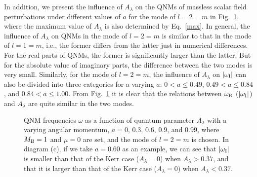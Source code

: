 \documentclass[12pt]{article}
\begin{document}
In addition, we present the influence of $A_\lambda$ on the QNMs of massless scalar field perturbations under different values of $a$ for the mode of $l=2=m$ in Fig.~\ref{fig:QNM-A-a-2}, where the maximum value of $A_\lambda$ is also determined by Eq.~\eqref{max}.
In general, the influence of $A_\lambda$ on QNMs in the mode of $l=2=m$ is similar to that in the mode of $l=1=m$, i.e., the former differs from the latter just in  numerical differences.
For the real parts of QNMs, the former is significantly larger than the latter.
But for the absolute value of imaginary parts, the difference between the two modes is very small.
Similarly, for the mode of $l=2=m$, the influence of $A_\lambda$ on $|\omega_{\rm I}|$ can also be divided into three categories for a varying $a$: $0<a\leq0.49$, $0.49<a\leq0.84$, and $0.84<a\leq1.00$.
From Fig.~\ref{fig:QNM-A-a-2} it is clear that the relations between $\omega_{\rm R}$ ($|\omega_{\rm I}|$) and $A_\lambda$ are quite similar in the two modes.

\begin{figure}[t]
\centering
\caption{QNM frequencies $\omega$ as a function of quantum parameter $A_\lambda$ with a varying angular momentum, $a=0$, $0.3$, $0.6$, $0.9$, and $0.99$, where $M_{\rm B}=1$ and $\mu=0$ are set, and the mode of $l=2=m$ is chosen. In diagram (c), if we take $a=0.60$ as an example, we can see that  $|\omega_{\rm I}|$ is smaller than that of the Kerr case ($A_\lambda=0$) when $A_\lambda>0.37$, and that it is larger than that of the Kerr case ($A_\lambda=0$) when $A_\lambda<0.37$.}
\label{fig:QNM-A-a-2}
    \end{figure}
\end{document}
